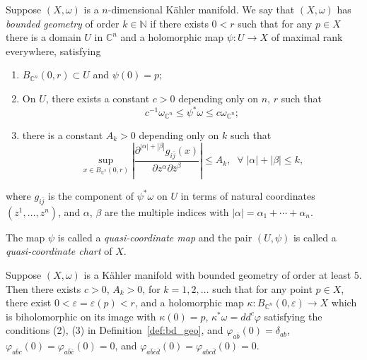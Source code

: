 \documentclass[10pt,a4paper]{amsart}
\begin{document}
\begin{definition}\label{def:bd_geo}
Suppose $(X,\omega)$ is a $n$-dimensional K\"ahler manifold. We say that $(X,\omega)$ has {\em bounded geometry} of order $k\in\mathbb{N}$ if there exists $0<r$ such that for any $p\in X$ there is  a domain $U$ in $\mathbb{C}^n$ and a  holomorphic map   $\psi:U  \rightarrow X $ of maximal rank everywhere,  satisfying 
\begin{enumerate}
    \item $B_{\mathbb{C}^n}(0,r)\subset U $ and $\psi(0)=p;$
    
    \item  On $U$, there exists a constant $c>0$ depending only on $n$, $r$ such that $$c^{-1}\omega_{\mathbb{C}^n}\leq \psi^*\omega \leq c\omega_{\mathbb{C}^n };$$
    \item  there is a constant $A_k>0$ depending only on $k$ such that
$$\sup_{x\in B_{\mathbb{C}^n}(0,r)}\left| \frac{\partial^{|\alpha|+|\beta|}g_{i\bar j}(x)}{\partial z^\alpha \partial \bar z^\beta}\right|\leq A_k, \;\;\forall\;|\alpha|+|\beta|\leq k,$$
\end{enumerate}
where $g_{i\bar j}$ is the component of $\psi^*\omega$ on $U$ in terms of natural coordinates $(z^1, \ldots ,z^n)$, and $\alpha$, $\beta$ are the multiple indices with $|\alpha|=\alpha_1+\cdots+\alpha_n$.

The map $\psi$ is called a {\em quasi-coordinate map} and the pair $(U,\psi)$ is called a {\em quasi-coordinate chart} of $X$. %
\end{definition}

\begin{lemma}\label{lem:normal_chart}
Suppose $(X,\omega)$ is a K\"ahler manifold with bounded geometry of order at least $ 5$.  Then there exists   $c>0$, $A_k>0$, for $k=1,2, \ldots $  such that for  any point $p\in X$,  there exist $0<\varepsilon=\varepsilon(p)< r$,  and a holomorphic map  $\kappa:  B_{\mathbb{C}^n}(0,\varepsilon) \rightarrow X $ which is biholomorphic on its image  with $\kappa(0)=p$, $\kappa^* \omega=dd^c \varphi$ satisfying the conditions (2), (3) in  Definition~\ref{def:bd_geo}, and $\varphi_{a\overline{b}}(0)=\delta_{a b}$, 
$\varphi_{a\overline{b} c}(0)=\varphi_{a\overline{b}\overline{c}}(0)=0$, and  $\varphi_{a \overline{b}\overline{c} \overline{d}}(0)=\varphi_{a b c\overline {d}}(0)=0$. 
\end{lemma}
\end{document}
